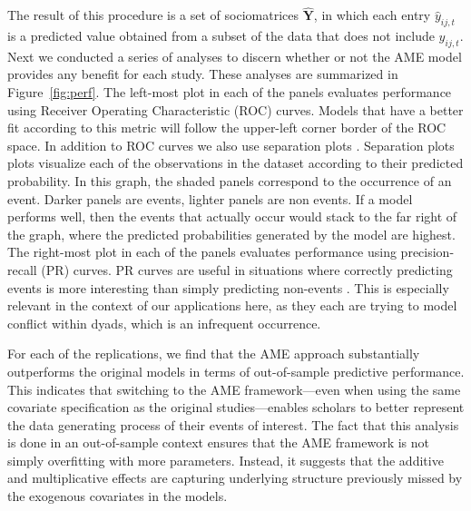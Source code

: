 The result of this procedure is a set of sociomatrices $\bm \hat Y$, in which each entry $\hat y_{ij,t}$ is a predicted value obtained from a subset of the data that does not include $y_{ij,t}$. Next we conducted a series of analyses to discern whether or not the AME model provides any benefit for each study. These analyses are summarized in Figure~\ref{fig:perf}. The left-most plot in each of the panels evaluates performance using Receiver Operating Characteristic (ROC) curves. Models that have a better fit according to this metric will follow the upper-left corner border of the ROC space. In addition to ROC curves we also use separation plots \citep{greenhill:etal:2011}.  Separation plots plots visualize each of the observations in the dataset according to their predicted probability. In this graph, the shaded panels correspond to the occurrence of an event. Darker panels are events, lighter panels are non events. If a model performs well, then the events that actually occur would stack to the far right of the graph, where the predicted probabilities generated by the model are highest. The right-most plot in each of the panels evaluates performance using precision-recall (PR) curves. PR curves are useful in situations where correctly predicting events is more interesting than simply predicting non-events \citep{davis:goadrich:2006}. This is especially relevant in the context of our applications here, as they each are trying to model conflict within dyads, which is an infrequent occurrence. 

For each of the replications, we find that the AME approach substantially outperforms the original models in terms of out-of-sample predictive performance. This indicates that switching to the AME framework---even when using the same covariate specification as the original studies---enables scholars to better represent the data generating process of their events of interest. The fact that this analysis is done in an out-of-sample context ensures that the AME framework is not simply overfitting with more parameters. Instead, it suggests that the additive and multiplicative effects are capturing underlying structure previously missed by the exogenous covariates in the models.

